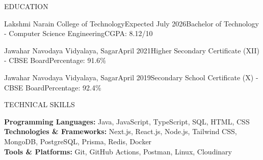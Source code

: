 \documentclass{resume}
\begin{document}
\begin{rSection}{EDUCATION}

\begin{rEducation}{Lakshmi Narain College of Technology}{Expected July 2026}{Bachelor of Technology - Computer Science Engineering}{CGPA: 8.12/10}
\end{rEducation}

\begin{rEducation}{Jawahar Navodaya Vidyalaya, Sagar}{April 2021}{Higher Secondary Certificate (XII) - CBSE Board}{Percentage: 91.6\%}
\end{rEducation}

\begin{rEducation}{Jawahar Navodaya Vidyalaya, Sagar}{April 2019}{Secondary School Certificate (X) - CBSE Board}{Percentage: 92.4\%}
\end{rEducation}

\end{rSection}

\begin{rSection}{TECHNICAL SKILLS}

\textbf{Programming Languages:} Java, JavaScript, TypeScript, SQL, HTML, CSS \\[2pt]
\textbf{Technologies \& Frameworks:} Next.js, React.js, Node.js, Tailwind CSS, MongoDB, PostgreSQL, Prisma, Redis, Docker \\[2pt]
\textbf{Tools \& Platforms:} Git, GitHub Actions, Postman, Linux, Cloudinary

\end{rSection}
\end{document}
